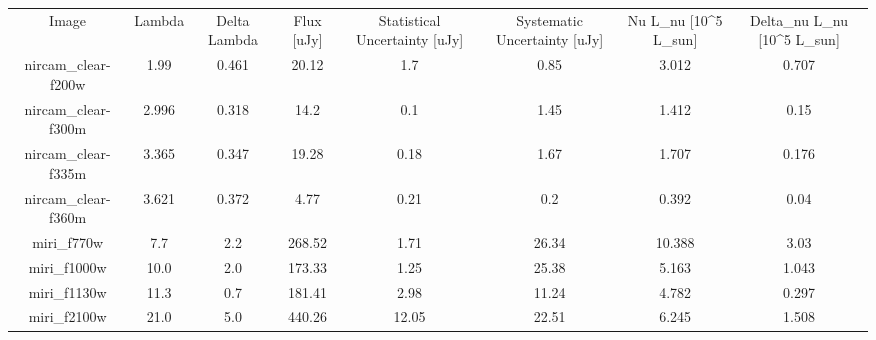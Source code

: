 \begin{table*}
\begin{tabular}{cccccccc}
Image & Lambda & Delta Lambda & Flux [uJy] & Statistical Uncertainty [uJy] & Systematic Uncertainty [uJy] & Nu L_nu [10^5 L_sun] & Delta_nu L_nu [10^5 L_sun] \\
nircam_clear-f200w & 1.99 & 0.461 & 20.12 & 1.7 & 0.85 & 3.012 & 0.707 \\
nircam_clear-f300m & 2.996 & 0.318 & 14.2 & 0.1 & 1.45 & 1.412 & 0.15 \\
nircam_clear-f335m & 3.365 & 0.347 & 19.28 & 0.18 & 1.67 & 1.707 & 0.176 \\
nircam_clear-f360m & 3.621 & 0.372 & 4.77 & 0.21 & 0.2 & 0.392 & 0.04 \\
miri_f770w & 7.7 & 2.2 & 268.52 & 1.71 & 26.34 & 10.388 & 3.03 \\
miri_f1000w & 10.0 & 2.0 & 173.33 & 1.25 & 25.38 & 5.163 & 1.043 \\
miri_f1130w & 11.3 & 0.7 & 181.41 & 2.98 & 11.24 & 4.782 & 0.297 \\
miri_f2100w & 21.0 & 5.0 & 440.26 & 12.05 & 22.51 & 6.245 & 1.508 \\
\end{tabular}
\end{table*}
